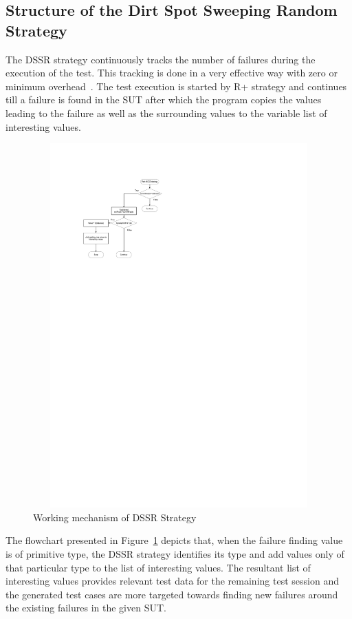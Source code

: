 \subsection{Structure of the Dirt Spot Sweeping Random Strategy}

The DSSR strategy continuously tracks the number of failures during the execution of the test. This tracking is done in a very effective way with zero or minimum overhead~\cite{leitner2009effectiveness}. The test execution is started by R+ strategy and continues till a failure is found in the SUT after which the program copies the values leading to the failure as well as the surrounding values to the variable list of interesting values. 

\begin{figure}[ht]
\centering
\includegraphics[width=12cm, height=14cm]{chapter4/flowchart1.pdf}
\caption{Working mechanism of DSSR Strategy}
\label{fig:Working_DSSS}
\end{figure}

The flowchart presented in Figure~\ref{fig:Working_DSSS} depicts that, when the failure finding value is of primitive type, the DSSR strategy identifies its type and add values only of that particular type to the list of interesting values. The resultant list of interesting values provides relevant test data for the remaining test session and the generated test cases are more targeted towards finding new failures around the existing failures in the given SUT.

